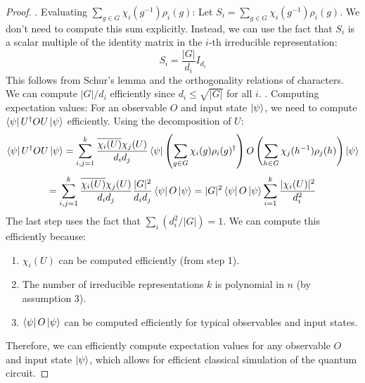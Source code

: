 \documentclass[10pt,a4paper]{amsart}
\begin{document}
\begin{proof}
. Evaluating $\sum_{g \in G} \chi_i(g^{-1}) \rho_i(g)$:
Let $S_i = \sum_{g \in G} \chi_i(g^{-1}) \rho_i(g)$. We don't need to compute this sum explicitly. Instead, we can use the fact that $S_i$ is a scalar multiple of the identity matrix in the $i$-th irreducible representation:
\begin{equation}
S_i = \frac{|G|}{d_i} I_{d_i}
\end{equation}
This follows from Schur's lemma and the orthogonality relations of characters. We can compute $|G|/d_i$ efficiently since $d_i \leq \sqrt{|G|}$ for all $i$.
. Computing expectation values:
For an observable $O$ and input state $\ket{\psi}$, we need to compute $\bra{\psi}U^\dagger O U\ket{\psi}$ efficiently. Using the decomposition of $U$:
\[
\bra{\psi}U^\dagger O U\ket{\psi} = \sum_{i,j=1}^k \frac{\overline{\chi_i(U)}\chi_j(U)}{d_i d_j} \bra{\psi}\left(\sum_{g \in G} \chi_i(g) \rho_i(g)^\dagger\right) O \left(\sum_{h \in G} \chi_j(h^{-1}) \rho_j(h)\right)\ket{\psi} \]\[
= \sum_{i,j=1}^k \frac{\overline{\chi_i(U)}\chi_j(U)}{d_i d_j} \frac{|G|^2}{d_i d_j} \bra{\psi}O\ket{\psi} 
= |G|^2 \bra{\psi}O\ket{\psi} \sum_{i=1}^k \frac{|\chi_i(U)|^2}{d_i^2}
\]
The last step uses the fact that $\sum_i (d_i^2 / |G|) = 1$. We can compute this efficiently because:
\begin{enumerate}
\item $\chi_i(U)$ can be computed efficiently (from step 1).
\item The number of irreducible representations $k$ is polynomial in $n$ (by assumption 3).
\item $\bra{\psi}O\ket{\psi}$ can be computed efficiently for typical observables and input states.
\end{enumerate}
Therefore, we can efficiently compute expectation values for any observable $O$ and input state $\ket{\psi}$, which allows for efficient classical simulation of the quantum circuit.
\end{proof}
\end{document}
